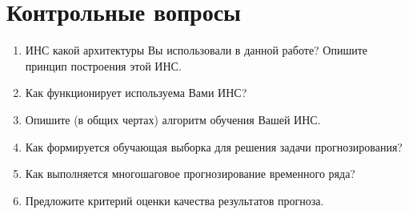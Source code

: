 \section*{Контрольные вопросы}

\begin{enumerate}
  \item ИНС какой архитектуры Вы использовали в данной работе? Опишите принцип построения этой ИНС.
  \item Как функционирует используема Вами ИНС?
  \item Опишите (в общих чертах) алгоритм обучения Вашей ИНС.
  \item Как формируется обучающая выборка для решения задачи прогнозирования?
  \item Как выполняется многошаговое прогнозирование временного ряда?
  \item Предложите критерий оценки качества результатов прогноза.
\end{enumerate}
